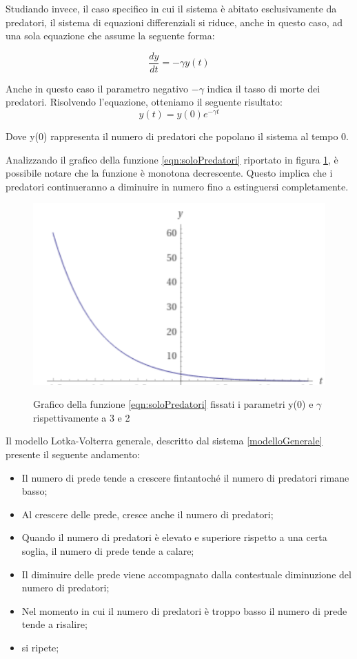 \documentclass[11pt]{article}
\begin{document}
\noindent Studiando invece, il caso specifico in cui il sistema è abitato esclusivamente da predatori, il sistema di equazioni differenziali si riduce, anche in questo caso, ad una sola equazione che assume la seguente forma: 

\[
    \frac{dy}{dt} = -\gamma y(t) 
\]

Anche in questo caso il parametro negativo $-\gamma$ indica il tasso di morte dei predatori. 
Risolvendo l'equazione, otteniamo il seguente risultato:
\begin{equation}\label{eqn:soloPredatori}
    y(t) = y(0)e^{-\gamma t}
\end{equation}

\noindent Dove y(0) rappresenta il numero di predatori che popolano il sistema al tempo 0.

\noindent Analizzando il grafico della funzione \eqref{eqn:soloPredatori} riportato in figura \ref{figPlotLotkaVolterraSoloPredatori}, è possibile notare che la funzione è monotona decrescente. Questo implica che i predatori continueranno a diminuire in numero fino a estinguersi completamente. 

\begin{figure}[h]
    \centering
    \includegraphics[scale = 1]{plotSoloPredatori.PNG}
    \label{figPlotLotkaVolterraSoloPredatori}
    \caption{Grafico della funzione \eqref{eqn:soloPredatori} fissati i parametri y(0) e $\gamma$ rispettivamente a 3 e 2}
\end{figure}

Il modello Lotka-Volterra generale, descritto dal sistema \ref{modelloGenerale} presente il seguente andamento: 
\begin{itemize}
    \item Il numero di prede tende a crescere fintantoché il numero di predatori rimane basso;
    \item Al crescere delle prede, cresce anche il numero di predatori;
    \item Quando il numero di predatori è elevato e superiore rispetto a una certa soglia, il numero di prede tende a calare;
    \item Il diminuire delle prede viene accompagnato dalla contestuale diminuzione del numero di predatori;
    \item Nel momento in cui il numero di predatori è troppo basso il numero di prede tende a risalire;
    \item si ripete;
\end{itemize}
\end{document}
